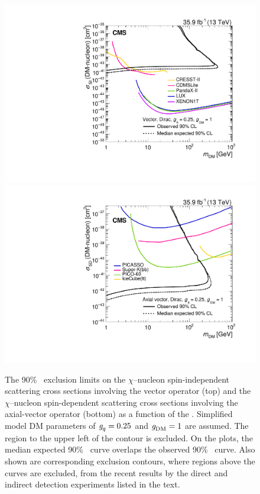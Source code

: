 \begin{figure}[htbp]
  \centering
    \includegraphics[width=0.45\textheight]{Impact/Figures/limits_direct.pdf}
    \includegraphics[width=0.45\textheight]{Impact/Figures/limits_indirect.pdf}
    \caption{
      The 90\% \CL\ exclusion limits on the $\chi$--nucleon spin-independent scattering cross sections involving the vector operator (top) and the $\chi$--nucleon spin-dependent scattering cross sections involving the axial-vector operator (bottom) as a function of the \mdm.
      Simplified model DM parameters of $\gq=0.25$ and $\gDM=1$ are assumed.
      The region to the upper left of the contour is excluded. 
      On the plots, the median expected 90\% \CL\ curve overlaps the observed 90\% \CL\ curve.
      Also shown are corresponding exclusion contours, where regions above the curves are excluded, from the recent results by the direct and indirect detection experiments listed in the text.
    }
    \label{fig:limits_direct}
\end{figure}


